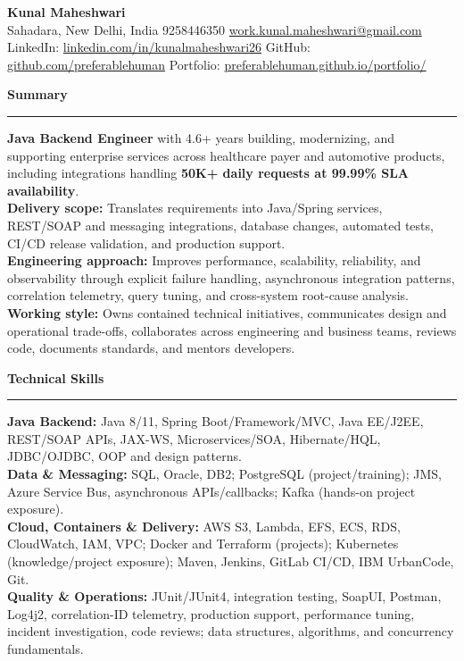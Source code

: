 \documentclass[11pt,letterpaper]{article}
\newcommand{\ressection}[1]{\Needspace{6\baselineskip}\vspace{8pt}\par\textbf{#1}\par\vspace{2pt}\hrule\vspace{5pt}}
\begin{document}
\pagestyle{empty}\raggedright\fontsize{11}{12.5}\selectfont

{\Large \textbf{Kunal Maheshwari}}\\
Sahadara, New Delhi, India \textbar{} 9258446350 \textbar{} \href{mailto:work.kunal.maheshwari@gmail.com}{work.kunal.maheshwari@gmail.com}\\
LinkedIn: \href{https://www.linkedin.com/in/kunalmaheshwari26}{linkedin.com/in/kunalmaheshwari26} \textbar{} GitHub: \href{https://github.com/preferablehuman}{github.com/preferablehuman} \textbar{} Portfolio: \href{https://preferablehuman.github.io/portfolio/}{preferablehuman.github.io/portfolio/}

\ressection{Summary}
\textbf{Java Backend Engineer} with 4.6+ years building, modernizing, and supporting enterprise services across healthcare payer and automotive products, including integrations handling \textbf{50K+ daily requests at 99.99\% SLA availability}.\\[2pt]
\textbf{Delivery scope:} Translates requirements into Java/Spring services, REST/SOAP and messaging integrations, database changes, automated tests, CI/CD release validation, and production support.\\[2pt]
\textbf{Engineering approach:} Improves performance, scalability, reliability, and observability through explicit failure handling, asynchronous integration patterns, correlation telemetry, query tuning, and cross-system root-cause analysis.\\[2pt]
\textbf{Working style:} Owns contained technical initiatives, communicates design and operational trade-offs, collaborates across engineering and business teams, reviews code, documents standards, and mentors developers.

\ressection{Technical Skills}
\textbf{Java Backend:} Java 8/11, Spring Boot/Framework/MVC, Java EE/J2EE, REST/SOAP APIs, JAX-WS, Microservices/SOA, Hibernate/HQL, JDBC/OJDBC, OOP and design patterns.\\
\textbf{Data \& Messaging:} SQL, Oracle, DB2; PostgreSQL (project/training); JMS, Azure Service Bus, asynchronous APIs/callbacks; Kafka (hands-on project exposure).\\
\textbf{Cloud, Containers \& Delivery:} AWS S3, Lambda, EFS, ECS, RDS, CloudWatch, IAM, VPC; Docker and Terraform (projects); Kubernetes (knowledge/project exposure); Maven, Jenkins, GitLab CI/CD, IBM UrbanCode, Git.\\
\textbf{Quality \& Operations:} JUnit/JUnit4, integration testing, SoapUI, Postman, Log4j2, correlation-ID telemetry, production support, performance tuning, incident investigation, code reviews; data structures, algorithms, and concurrency fundamentals.
\end{document}
